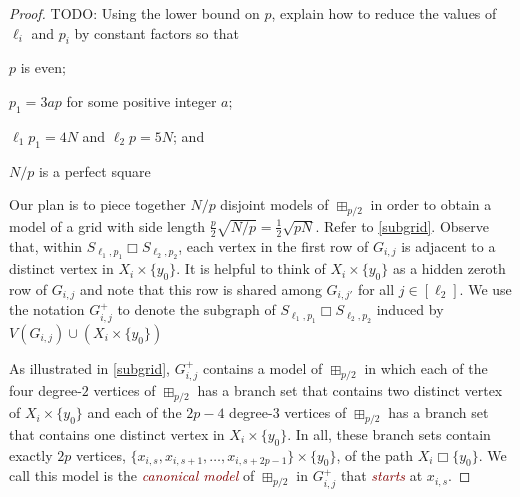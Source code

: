 \documentclass[lotsofwhite]{patmorin}
\newcommand{\defn}[1]{\textcolor{Maroon}{\emph{#1}}}
\newcommand{\boxprod}{\mathbin{\Box}}
\renewcommand{\ge}{\geqslant}
\newcommand{\PP}{\mathcal{P}}
\theoremstyle{plain}
\theoremstyle{definition}
\begin{document}
\begin{proof}
  TODO: Using the lower bound on $p$, explain how to reduce the values of $\ell_i$ and $p_i$ by constant factors so that
   \begin{compactenum}
     \item $p$ is even;
     \item $p_1 = 3ap$ for some positive integer $a$;
     \item $\ell_1p_1 = 4N$ and $\ell_2 p=5N$; and
     \item $N/p$ is a perfect square
   \end{compactenum}


  Our plan is to piece together $N/p$ disjoint models of $\boxplus_{p/2}$ in order to obtain a model of a grid with side length $\tfrac{p}{2}\sqrt{N/p}=\tfrac{1}{2}\sqrt{pN}$.  Refer to \cref{subgrid}.  Observe that, within $S_{\ell_1,p_1}\boxprod S_{\ell_2,p_2}$, each vertex in the first row of $G_{i,j}$ is adjacent to a distinct vertex in $X_i\times\{y_0\}$. It is helpful to think of $X_i\times\{y_0\}$ as a hidden zeroth row of $G_{i,j}$ and note that this row is shared among $G_{i,j'}$ for all $j\in[\ell_2]$.  We use the notation $G_{i,j}^+$ to denote the subgraph of $S_{\ell_1,p_1}\boxprod S_{\ell_2,p_2}$ induced by $V(G_{i,j})\cup (X_i\times\{y_0\})$

  As illustrated in \cref{subgrid}, $G_{i,j}^+$ contains a model of $\boxplus_{p/2}$ in which each of the four degree-$2$ vertices of $\boxplus_{p/2}$ has a branch set that contains two distinct vertex of $X_i\times\{y_0\}$ and each of the $2p-4$ degree-$3$ vertices of $\boxplus_{p/2}$ has a branch set that contains one distinct vertex in $X_i\times\{y_0\}$.  In all, these branch sets contain exactly $2p$ vertices, $\{x_{i,s},x_{i,s+1},\ldots,x_{i,s+2p-1}\}\times\{y_0\}$, of the path $X_i\boxprod\{y_0\}$. We call this model is the \defn{canonical model} of $\boxplus_{p/2}$ in $G_{i,j}^+$ that \defn{starts} at $x_{i,s}$.


\end{proof}
\end{document}
